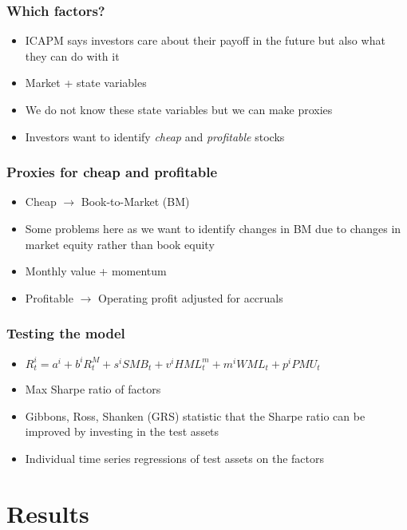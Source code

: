 \documentclass{beamer}
\begin{document}
\begin{frame}
\frametitle{Which factors?}
\begin{itemize}
    \item<1-> ICAPM says investors care about their payoff in the future but
    also what they can do with it
    \item<1-> Market + state variables
    \item<1-> We do not know these state variables but we can make proxies
    \item<2-> Investors want to identify \emph{cheap} and \emph{profitable} stocks
\end{itemize}
\end{frame}

\begin{frame}
\frametitle{Proxies for cheap and profitable}
\begin{itemize}
    \item<1-> Cheap $\rightarrow$ Book-to-Market (BM)
    \item<1-> Some problems here as we want to identify changes in BM due to
    changes in market equity rather than book equity
    \item<1-> Monthly value + momentum
    \item<2-> Profitable $\rightarrow$ Operating profit adjusted for accruals
\end{itemize}
\end{frame}

\begin{frame}
\frametitle{Testing the model}
\begin{itemize}
    \item<1-> $R_t^i = a^i + b^iR_t^M + s^iSMB_t + v^iHML_t^m + m^iWML_t + p^iPMU_t$
    \item<2-> Max Sharpe ratio of factors
    \item<3-> Gibbons, Ross, Shanken (GRS) statistic that the Sharpe ratio
    can be improved by investing in the test assets
    \item<4-> Individual time series regressions of test assets on the factors
\end{itemize}
\end{frame}

\section{Results}
\end{document}

